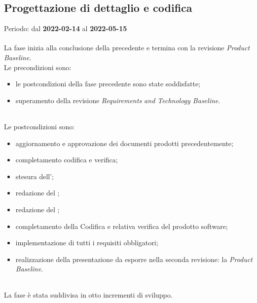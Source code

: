 \subsection{Progettazione di dettaglio e codifica}
Periodo: dal \textbf{2022-02-14} al \textbf{2022-05-15} \mbox{} \\ \mbox{} \\
La fase inizia alla conclusione della precedente e termina con la revisione \textit{Product Baseline.} \mbox{} \\
Le precondizioni sono:
\begin{itemize}
	\item le postcondizioni della fase precedente sono state soddisfatte;
 	\item superamento della revisione \textit{Requirements and Technology Baseline}.
\end{itemize} \mbox{} \\
Le postcondizioni sono:
\begin{itemize}
	\item aggiornamento e approvazione dei documenti prodotti precedentemente;
	\item completamento codifica e verifica;
	\item stesura dell'\textit{{\SA}};
	\item redazione del \textit{{\MU}};
 	\item redazione del \textit{{\MA}};
    \item completamento della Codifica e relativa verifica del prodotto software;
    \item implementazione di tutti i requisiti obbligatori;
	\item realizzazione della presentazione da esporre nella seconda revisione: la \textit{Product Baseline}\glo{}. 
\end{itemize} \mbox{} \\
La fase è stata suddivisa in otto incrementi di sviluppo.

